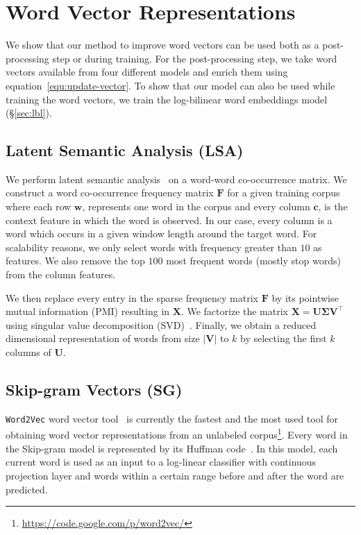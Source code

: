 \documentclass[11pt]{article}
\begin{document}
\section{Word Vector Representations}
\label{sec:vectors}

We show that our method to improve word vectors can be used both as a 
post-processing step or during training.
For the post-processing step, we take word vectors available from four different 
models and enrich them using
equation~\ref{equ:update-vector}. To show that our model can also be used 
while training the word vectors, we train the log-bilinear word embeddings model (\S\ref{sec:lbl}).

\subsection{Latent Semantic Analysis (LSA)}
\label{sec:lsa}

We perform latent semantic analysis~\cite{deerwester-90} on a word-word co-occurrence matrix.
We construct a word co-occurrence frequency matrix $\boldsymbol{F}$ for a given training corpus where
each row $\boldsymbol{w}$, represents one word in the corpus and every column $\boldsymbol{c}$, is the context 
feature in which the word is observed. In our case, every column is a word which occurs
in a given window length around the target word. For scalability reasons, we
only select words with frequency greater than $10$ as features. We also remove
the top $100$ most frequent words (mostly stop words) from the column features.

We then replace every entry in the sparse frequency matrix $\boldsymbol{F}$ by 
its pointwise mutual information (PMI) \cite{Church:1990:WAN:89086.89095,Turney:2001:MWS:645328.650004}
resulting in $\boldsymbol{X}$.
We factorize the matrix $\boldsymbol{X} = \boldsymbol{U} \boldsymbol{\Sigma} \boldsymbol{V}^{\top}$ using singular value decomposition (SVD)~\cite{Golub:1996:MC:248979}. Finally, we obtain a reduced dimensional
representation of words from size $\left|\boldsymbol{V}\right|$ to $k$ by 
selecting the first $k$ columns of $\boldsymbol{U}$.

\subsection{Skip-gram Vectors (SG)}
\label{sec:sg}

\texttt{Word2Vec} word vector tool~\cite{mikolov2013efficient} is currently the fastest and 
the most used tool for obtaining word 
vector representations from an unlabeled 
corpus\footnote{\url{https://code.google.com/p/word2vec/}}. 
Every word in the Skip-gram model is represented by its Huffman code~\cite{citeulike:1320251}. In 
this model, each current word is used as an input to a log-linear classifier
with continuous projection layer and words within a certain range before and after the word
are predicted. 
\end{document}
